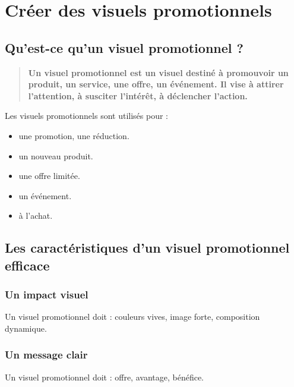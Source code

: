 \section{Créer des visuels promotionnels}

\subsection{Qu'est-ce qu'un visuel promotionnel ?}

\begin{quote}
\textbf{Un visuel promotionnel est un visuel destiné à promouvoir un produit, un service, une offre, un événement. Il vise à attirer l'attention, à susciter l'intérêt, à déclencher l'action.}
\end{quote}

Les visuels promotionnels sont utilisés pour :

\begin{itemize}
    \item {} une promotion, une réduction.
    \item {} un nouveau produit.
    \item {} une offre limitée.
    \item {} un événement.
    \item {} à l'achat.
\end{itemize}

\subsection{Les caractéristiques d'un visuel promotionnel efficace}

\subsubsection{Un impact visuel}

Un visuel promotionnel doit  : couleurs vives, image forte, composition dynamique.

\subsubsection{Un message clair}

Un visuel promotionnel doit  : offre, avantage, bénéfice.

